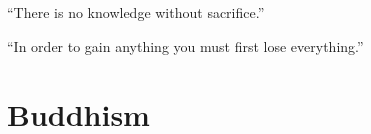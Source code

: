 \documentclass{article}
\begin{document}
\begin{spacing}{1.2}
    ``There is no knowledge without sacrifice.''

    ``In order to gain anything you must first lose everything.''

    \section{Buddhism}
    
    \end{spacing}
    
\end{document}
